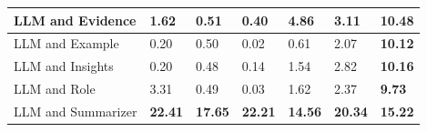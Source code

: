 \begin{tabular}{|l|l|l|l|l|l|l|}
 \hline
 LLM and Evidence & 1.62 & 0.51 & 0.40 & 4.86 & 3.11 & \textbf{10.48} \\
 \hline
 LLM and Example & 0.20 & 0.50 & 0.02 & 0.61 & 2.07 & \textbf{10.12} \\
 \hline
 LLM and Insights & 0.20 & 0.48 & 0.14 & 1.54 & 2.82 & \textbf{10.16} \\
 \hline
 LLM and Role & 3.31 & 0.49 & 0.03 & 1.62 & 2.37 & \textbf{9.73} \\
 \hline
 LLM and Summarizer & \textbf{22.41} & \textbf{17.65} & \textbf{22.21} & \textbf{14.56} & \textbf{20.34} & \textbf{15.22} \\
\hline
\end{tabular}
